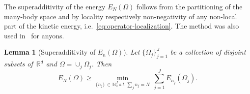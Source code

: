\documentclass[10pt]{amsart}
\newtheorem{lemm}[theo]{Lemma}\newtheorem{prop}[theo]{Proposition}\newtheorem{coro}[theo]{Corollary}\newtheorem{conj}[theo]{Conjecture}
\theoremstyle{definition}\newtheorem{defi}[theo]{Definition}\newtheorem{rema}[theo]{Remark}\newtheorem{exam}[theo]{Example}\newtheorem{exem}[theo]{Example}\newtheorem{nota}[theo]{Notation}
\newcommand*\R {\mathbb{R}}
\newcommand\1{{\ensuremath {\mathds 1} }}
\begin{document}
The superadditivity of the energy $E_N(\Omega)$ follows from the partitioning of the many-body space and by locality respectively non-negativity of any non-local part of the kinetic energy, i.e.~\eqref{eq:operator-localization}. The method was also used in~\cite[Lemma~4.2]{LunSei-18} for anyons.

\begin{lemm}[Superadditivity of $E_n(\Omega)$]\label{lem:superadd}
Let $\{\Omega_j\}_{j=1}^J$ be a collection of disjoint subsets of~$\R^d$ and $\Omega=\cup_{j} \Omega_j$. Then
\begin{equation}\label{eq:superadd}
E_N(\Omega) \geq \min_{\{n_j\}\,\in\,\mathbb{N}_0^J \, s.t. \, \sum_{j} n_j=N} \, \sum_{j=1}^J E_{n_j}(\Omega_j).
\end{equation}
\end{lemm}
\end{document}
